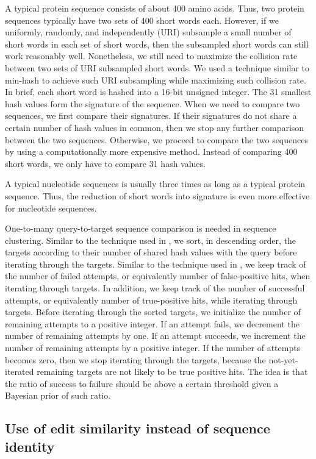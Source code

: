 \documentclass[11pt,letterpaper]{llncs2e/llncs}
\begin{document}
A typical protein sequence consists of about 400 amino acids.
Thus, two protein sequences typically have two sets of 400 short words each.
However, if we uniformly, randomly, and independently (URI) subsample a small number of short words in each set of short words, then the subsampled short words can still work reasonably well. 
Nonetheless, we still need to maximize the collision rate between two sets of URI subsampled short words.
We used a technique similar to min-hash to achieve such URI subsampling while maximizing such collision rate.
In brief, each short word is hashed into a 16-bit unsigned integer.
The 31 smallest hash values form the signature of the sequence.
When we need to compare two sequences, we first compare their signatures.
If their signatures do not share a certain number of hash values in common, then we stop any further comparison between the two sequences. 
Otherwise, we proceed to compare the two sequences by using a computationally more expensive method.
Instead of comparing 400 short words, we only have to compare 31 hash values.

A typical nucleotide sequences is usually three times as long as a typical protein sequence.
Thus, the reduction of short words into signature is even more effective for nucleotide sequences.

One-to-many query-to-target sequence comparison is needed in sequence clustering. 
Similar to the technique used in \citet{li2006cd}, we sort, in descending order, the targets according to their number of shared hash values with the query before iterating through the targets. 
Similar to the technique used in \citet{edgar2010search}, we keep track of the number of failed attempts, or equivalently number of false-positive hits, when iterating through targets.
In addition, we keep track of the number of successful attempts, or equivalently number of true-positive hits, while iterating through targets.
Before iterating through the sorted targets, we initialize the number of remaining attempts to a positive integer.
If an attempt fails, we decrement the number of remaining attempts by one.
If an attempt succeeds, we increment the number of remaining attempts by a positive integer.
If the number of attempts becomes zero, then we stop iterating through the targets, because the not-yet-iterated remaining targets are not likely to be true positive hits.
The idea is that the ratio of success to failure should be above a certain threshold given a Bayesian prior of such ratio.

\subsection{Use of edit similarity instead of sequence identity}
\end{document}
